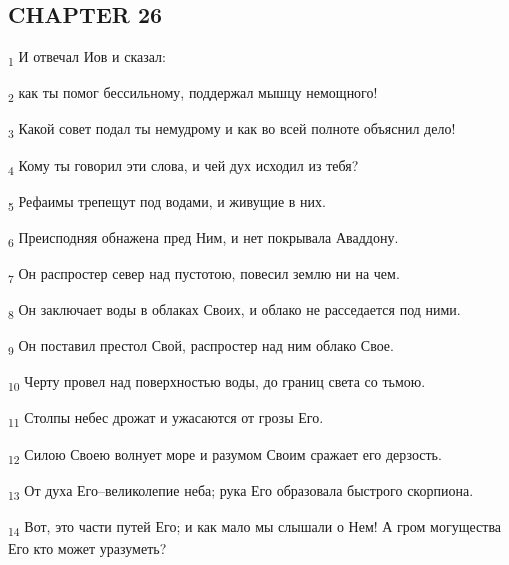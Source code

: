 \subsection{CHAPTER 26}
\begin{tcolorbox}
\textsubscript{1} И отвечал Иов и сказал:
\end{tcolorbox}
\begin{tcolorbox}
\textsubscript{2} как ты помог бессильному, поддержал мышцу немощного!
\end{tcolorbox}
\begin{tcolorbox}
\textsubscript{3} Какой совет подал ты немудрому и как во всей полноте объяснил дело!
\end{tcolorbox}
\begin{tcolorbox}
\textsubscript{4} Кому ты говорил эти слова, и чей дух исходил из тебя?
\end{tcolorbox}
\begin{tcolorbox}
\textsubscript{5} Рефаимы трепещут под водами, и живущие в них.
\end{tcolorbox}
\begin{tcolorbox}
\textsubscript{6} Преисподняя обнажена пред Ним, и нет покрывала Аваддону.
\end{tcolorbox}
\begin{tcolorbox}
\textsubscript{7} Он распростер север над пустотою, повесил землю ни на чем.
\end{tcolorbox}
\begin{tcolorbox}
\textsubscript{8} Он заключает воды в облаках Своих, и облако не расседается под ними.
\end{tcolorbox}
\begin{tcolorbox}
\textsubscript{9} Он поставил престол Свой, распростер над ним облако Свое.
\end{tcolorbox}
\begin{tcolorbox}
\textsubscript{10} Черту провел над поверхностью воды, до границ света со тьмою.
\end{tcolorbox}
\begin{tcolorbox}
\textsubscript{11} Столпы небес дрожат и ужасаются от грозы Его.
\end{tcolorbox}
\begin{tcolorbox}
\textsubscript{12} Силою Своею волнует море и разумом Своим сражает его дерзость.
\end{tcolorbox}
\begin{tcolorbox}
\textsubscript{13} От духа Его--великолепие неба; рука Его образовала быстрого скорпиона.
\end{tcolorbox}
\begin{tcolorbox}
\textsubscript{14} Вот, это части путей Его; и как мало мы слышали о Нем! А гром могущества Его кто может уразуметь?
\end{tcolorbox}
